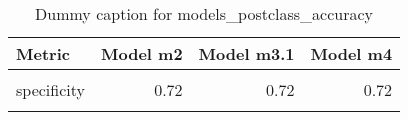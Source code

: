 \begin{table}
\centering
\caption{Dummy caption for models_postclass_accuracy}
\centering
\fontsize{10}{12}\selectfont
\begin{tabular}[t]{lrrr}
\toprule
Metric & Model m2 & Model m3.1 & Model m4\\
\midrule
\cellcolor{gray!10}{sensitivity} & \cellcolor{gray!10}{0.69} & \cellcolor{gray!10}{0.69} & \cellcolor{gray!10}{0.68}\\
specificity & 0.72 & 0.72 & 0.72\\
\cellcolor{gray!10}{overall\_accuracy} & \cellcolor{gray!10}{0.70} & \cellcolor{gray!10}{0.70} & \cellcolor{gray!10}{0.70}\\
\bottomrule
\end{tabular}
\end{table}
